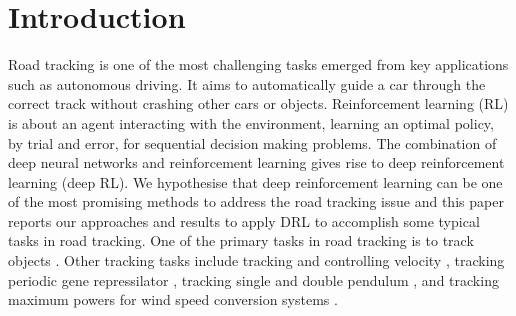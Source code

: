 \documentclass{svproc}
\begin{document}
	\section{Introduction}
	Road tracking is one of the most challenging tasks emerged from key applications such as autonomous driving. It aims to automatically guide a car through the correct track without crashing other cars or objects.  
	Reinforcement learning (RL) is about an agent interacting with the environment, learning an optimal policy, by trial and error, for sequential decision making problems.
	The combination of deep neural networks and reinforcement learning gives rise to deep
	reinforcement learning (deep RL). We hypothesise that deep reinforcement learning %
	can be one of the most promising %
	methods %
	to address 
	the road tracking issue and this paper %
	reports our approaches and results to apply DRL to accomplish some typical tasks in road tracking. 
	One of the primary tasks in road tracking is to track objects \cite{Grigore2000Reinforcement,Cohen2010Reinforcement,Liu2004Reinforcement,Supancic2017Tracking}. %
	Other tracking tasks include tracking and controlling velocity \cite{Jinlin2009Neurofuzzy}, tracking periodic gene repressilator \cite{Sootla2013On}, tracking single and double pendulum \cite{Hall2011Reinforcement}, and tracking maximum powers for wind speed conversion systems \cite{Wei2015Reinforcement}. 
\end{document}
